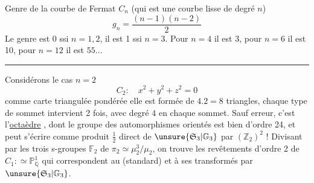 Genre de la courbe de Fermat $C_n$ (qui est une courbe
  lisse de degré $n$)
\[
g_n=\frac{(n-1)(n-2)}2
\]
Le genre est 0 ssi $n=1,2$, il est 1 ssi $n=3$.
Pour $n=4$ il est 3, pour $n=6$ il est 10,
pour $n=12$ il est $55\ldots$

\rule{3cm}{0.4pt}

Considérons le cas $n=2$
\[
C_2:\quad x^2+y^2+z^2=0
\]
comme carte triangulée pondérée elle est formée de $4.2=8$ triangles,
chaque type de sommet intervient 2 fois, avec degré
$4$  en chaque sommet.
Sauf erreur, c'est l'\uline{octaèdre} , dont le groupe des
automorphismes orientés est bien 
d'ordre 24, et peut s'écrire comme produit $\frac12$ direct de
$\unsure{\mathfrak S_3|\mathbb G_3}$ par $(\mathbb Z_2)^2$ !
Divisant par les trois s-groupes $\mathbb F_2$ de
$\pi_2\simeq\mu_2^3/\mu_2$, on trouve les  revêtements
d'ordre 2 de $C_1:\simeq\mathbb P^1_{\mathbb Q}$ qui correspondent
au   
(standard) et à ses transformés par $\unsure{\mathfrak S_3|\mathbb G_3}$.


